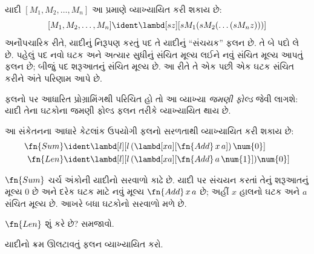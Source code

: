 \label{guunit:OLP-0650}


યાદી $[M_1, M_2, \ldots, M_n]$ આ પ્રમાણે
વ્યાખ્યાયિત કરી શકાય છે:
\[
  [M_1, M_2, \ldots, M_n] \ident \lambd[sz][s M_1 (s M_2 (\ldots (s M_n z)))]
\]
અનૌપચારિક રીતે, યાદીનું નિરૂપણ કરતું પદ
તે યાદીનું ``સંચયક'' ફલન છે. તે બે પદો
લે છે. પહેલું પદ નવો ઘટક અને અત્યાર સુધીનું
સંચિત મૂલ્ય લઈને નવું સંચિત મૂલ્ય આપતું
ફલન છે; બીજું પદ શરૂઆતનું સંચિત મૂલ્ય છે.
આ રીતે તે એક પછી એક ઘટક સંચિત કરીને અંતે
પરિણામ આપે છે.


\begin{digress}
  ફલનો પર આધારિત પ્રોગ્રામિંગથી પરિચિત હો
  તો આ વ્યાખ્યા \emph{જમણી ફોલ્ડ} જેવી
  લાગશે: યાદી તેના ઘટકોના જમણી ફોલ્ડ
  ફલન તરીકે વ્યાખ્યાયિત થાય છે.
\end{digress}

આ સંકેતનના આધારે કેટલાંક ઉપયોગી ફલનો
સરળતાથી વ્યાખ્યાયિત કરી શકાય છે:
\begin{align*}
  \fn{Sum} & \ident
  \lambd[l][l \, (\lambd[xa][\fn{Add} \, x \, a])\,  \num{0}]\\
  \fn{Len} & \ident
  \lambd[l][l \, (\lambd[xa][\fn{Add} \, a \, \num{1}]) \num{0}]
\end{align*}

$\fn{Sum}$ ચર્ચ અંકોની યાદીનો સરવાળો
કાઢે છે. યાદી પર સંચયન કરતાં તેનું
શરૂઆતનું મૂલ્ય $\num{0}$ છે અને દરેક
ઘટક માટે નવું મૂલ્ય $\fn{Add} \, x\, a$
છે; અહીં $x$ હાલનો ઘટક અને $a$ સંચિત
મૂલ્ય છે. આખરે બધા ઘટકોનો સરવાળો મળે છે.

\begin{prob}
  $\fn{Len}$ શું કરે છે? સમજાવો.
\end{prob}

\begin{prob}
  યાદીનો ક્રમ ઊલટાવતું ફલન વ્યાખ્યાયિત કરો.
\end{prob}
\endgroup
\endgroup


\OLEndPartHook
